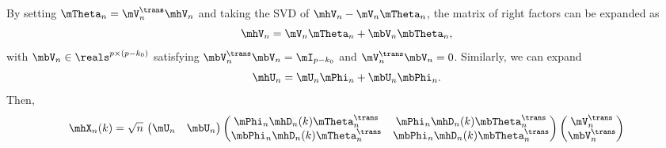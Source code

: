 By setting $\mTheta_n = \mV_n^\trans \mhV_n$ and 
taking the SVD of $\mhV_n - \mV_n \mTheta_n$, the matrix of right factors can 
be expanded as
\[
    \mhV_n = \mV_n \mTheta_n + \mbV_n \mbTheta_n,
\]
with $\mbV_n \in \reals^{p \times (p-k_0)}$  satisfying
$\mbV_n^\trans \mbV_n = \mI_{p-k_0}$ and $\mV_n^\trans \mbV_n = 0$.  
Similarly, we can expand
\[
    \mhU_n = \mU_n \mPhi_n + \mbU_n \mbPhi_n.
\]
Then,
\[
    \mhX_n(k)
        =
        \sqrt{n} \,
        \left(
        \begin{matrix}
            \mU_n & \mbU_n
        \end{matrix}
        \right)
        \left(
        \begin{matrix}
            \mPhi_n \mhD_n(k) \mTheta_n^\trans &
                \mPhi_n \mhD_n(k) \mbTheta_n^\trans \\
            \mbPhi_n \mhD_n(k) \mTheta_n^\trans &
                \mbPhi_n \mhD_n(k) \mbTheta_n^\trans
        \end{matrix}
        \right)
        \left(
        \begin{matrix}
            \mV_n^\trans \\
            \mbV_n^\trans
        \end{matrix}
        \right)
\]

